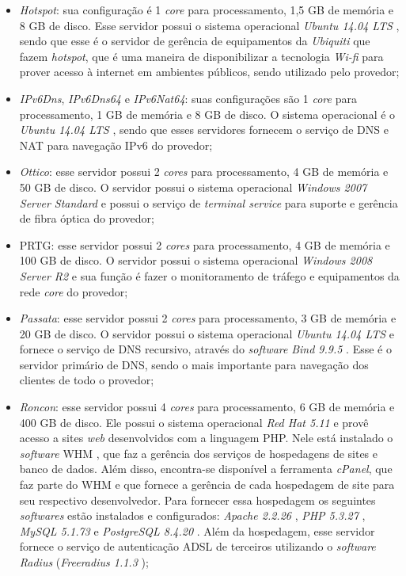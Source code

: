 \begin{itemize}
 \item \textit{Hotspot}: sua configuração é 1 \textit{core} para processamento, 1,5 GB de memória e 8 GB de disco. Esse servidor possui o 
 sistema operacional \textit{Ubuntu 14.04 \ac{LTS}} \cite{ubuntu}, sendo que esse é o servidor de gerência de equipamentos da \textit{Ubiquiti} 
 que fazem \textit{hotspot}, que é uma maneira de disponibilizar a tecnologia \textit{Wi-fi} para prover acesso à internet em ambientes públicos, 
 sendo utilizado pelo provedor;
 
 \item \textit{IPv6Dns}, \textit{IPv6Dns64} e \textit{IPv6Nat64}: suas configurações são 1 \textit{core} para processamento, 1 GB de memória e 
 8 GB de disco. O sistema operacional é o \textit{Ubuntu 14.04 \ac{LTS}} \cite{ubuntu}, sendo que esses servidores fornecem o serviço de \ac{DNS} 
 e \ac{NAT} para navegação \ac{IPv6} do provedor;
 
 \item \textit{Ottico}: esse servidor possui 2 \textit{cores} para processamento, 4 GB de memória e 50 GB de disco. O servidor possui o sistema 
 operacional \textit{Windows 2007 Server Standard} e possui o serviço de \textit{terminal service} para suporte e gerência de fibra óptica do 
 provedor;
 
 \item \ac{PRTG}: esse servidor possui 2 \textit{cores} para processamento, 4 GB de memória e 100 GB de disco. O servidor possui o sistema 
 operacional \textit{Windows 2008 Server R2} e sua função é fazer o monitoramento de tráfego e equipamentos da rede \textit{core} do provedor;
 
 \item \textit{Passata}: esse servidor possui 2 \textit{cores} para processamento, 3 GB de memória e 20 GB de disco. O servidor possui o 
 sistema operacional \textit{Ubuntu 14.04 \ac{LTS}} \cite{ubuntu} e fornece o serviço de \ac{DNS} recursivo, através do \textit{software} 
 \textit{Bind 9.9.5} \cite{bind}. Esse é o servidor primário de \ac{DNS}, sendo o mais importante para navegação dos clientes de todo o provedor;
 
 \item \textit{Roncon}: esse servidor possui 4 \textit{cores} para processamento, 6 GB de memória e 400 GB de disco. Ele possui o sistema
 operacional \textit{Red Hat 5.11} \cite{redhat} e provê acesso a sites \textit{web} desenvolvidos com a linguagem \ac{PHP}. Nele está instalado 
 o \textit{software} \ac{WHM} \cite{whm}, que faz a gerência dos serviços de hospedagens de sites e banco de dados. Além disso, encontra-se 
 disponível a ferramenta \textit{cPanel}, que faz parte do \ac{WHM} e que fornece a gerência de cada hospedagem de site para seu respectivo 
 desenvolvedor. Para fornecer essa hospedagem os seguintes \textit{softwares} estão instalados e configurados: \textit{Apache 2.2.26} \cite{apache}, 
 \textit{\ac{PHP} 5.3.27} \cite{php}, \textit{MySQL 5.1.73} \cite{mysql} e \textit{PostgreSQL 8.4.20} \cite{postgres}.
 Além da hospedagem, esse servidor fornece o serviço de autenticação \ac{ADSL} de terceiros utilizando o \textit{software} \textit{Radius} 
 (\textit{Freeradius 1.1.3} \cite{freeradius});
 

\end{itemize}
